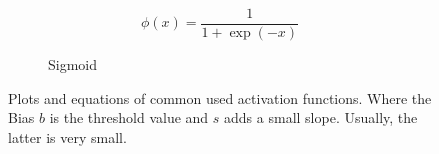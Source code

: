 \begin{figure}
	\begin{subfigure}{.5\textwidth}
		\centering
		
		\begin{equation*}
			\phi(x) = \frac{1}{1+\exp(-x)}
		\end{equation*}
		\caption{Sigmoid}
		\label{fig:sigmoid-activation}
	\end{subfigure}
	\caption[Activation Functions]{Plots and equations of common used activation functions. Where the Bias $b$ is the threshold value and $s$ adds a small slope. Usually, the latter is very small.}
	\label{fig:activation-functions}
\end{figure}